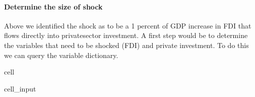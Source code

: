 \documentclass[letterpaper,10pt,english]{jupyterBook}
\begin{document}
\paragraph{Determine the size of shock}
\label{\detokenize{content/05_WBModels/ScenarioAnalysis:determine-the-size-of-shock}}
\sphinxAtStartPar
Above we identified the shock as to be a 1 percent of GDP increase in FDI that flows directly into private\sphinxhyphen{}sector investment.  A first step would be to determine the variables that need to be shocked (FDI) and private investment. To do this we can query the variable dictionary.

\begin{sphinxuseclass}{cell}\begin{sphinxVerbatimInput}

\begin{sphinxuseclass}{cell_input}
\begin{sphinxVerbatim}[commandchars=\\\{\}]
\PYG{p}{[}\PYG{p}{]}
\end{sphinxVerbatim}

\end{sphinxuseclass}\end{sphinxVerbatimInput}
\begin{sphinxVerbatimOutput}


\end{sphinxVerbatimOutput}
\end{sphinxuseclass}
\end{document}
